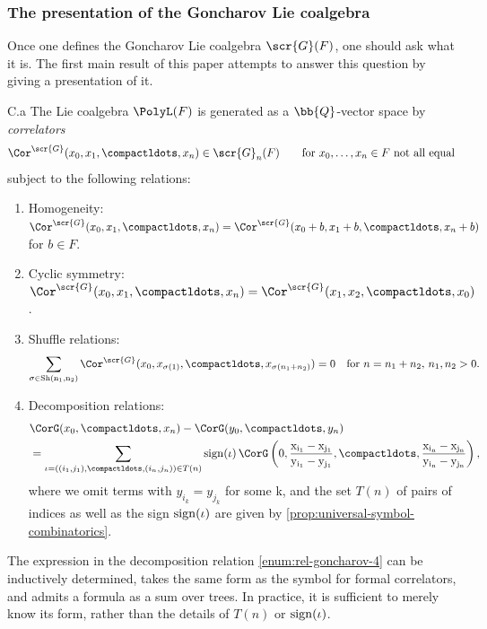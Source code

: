 \documentclass[a4paper]{amsart}
\begin{document}
\subsubsection{The presentation of the Goncharov Lie coalgebra}
Once one defines the Goncharov Lie coalgebra $\scr{G}(F)$, one should ask what it is. The first main result of this paper attempts to answer this question by giving a presentation of it.

\begin{customthm}{C.a}\label{thm:polyl-presentation-additive}
    The Lie coalgebra $\PolyL(F)$ is generated as a $\bb{Q}$-vector space by \emph{correlators}
    \[\Cor^\scr{G}(x_0,x_1,\compactldots,x_n) \in \scr{G}_n(F) \qquad \text{for $x_0,\ldots,x_n \in F$ not all equal }\]  
    subject to the following relations:
    \begin{enumerate}[\noindent (1)]
\item \label{enum:rel-goncharov-1} Homogeneity: $\Cor^\scr{G}(x_0,x_1,\compactldots,x_n)=\Cor^\scr{G}(x_0+b,x_1+b,\compactldots,x_n+b)$ for $b\in F$.
\item \label{enum:rel-goncharov-2} Cyclic symmetry: $\Cor^\scr{G}(x_0,x_1,\compactldots,x_n)=\Cor^\scr{G}(x_1,x_2,\compactldots,x_0)$.
\item \label{enum:rel-goncharov-3} Shuffle relations: 
\[\sum_{\sigma \in \rm{Sh}(n_1,n_2)} \Cor^\scr{G}(x_0,x_{\sigma(1)},\compactldots,x_{\sigma(n_1+n_2)}) =0 \quad 
\text{for $n=n_1+n_2$, $n_1,n_2>0$.}\]
\item \label{enum:rel-goncharov-4} Decomposition relations:
\begin{align*}
    &\CorG(x_0,\compactldots,x_n)-\CorG(y_0,\compactldots,y_n)\\
     &=\sum_{\iota=((i_1,j_1),\compactldots,(i_{n},j_n))\in T(n)}\rm{sign}(\iota)\,
     \CorG\left(0,\frac{x_{i_1}-x_{j_1}}{y_{i_1}-y_{j_1}},\compactldots,\frac{x_{i_n}-x_{j_n}}{y_{i_n}-y_{j_n}}\right),
\end{align*}
where we omit terms with $y_{i_k}=y_{j_k}$ for some k, and the set $T(n)$ of pairs of indices as well as the sign $\rm{sign}(\iota)$ are given by \cref{prop:universal-symbol-combinatorics}.
\end{enumerate}
\end{customthm}

\begin{remark*}The expression in the decomposition relation \eqref{enum:rel-goncharov-4} can be inductively determined, takes the same form as the symbol for formal correlators, and admits a formula as a sum over trees. In practice, it is sufficient to merely know its form, rather than the details of $T(n)$ or $\rm{sign}(\iota)$.\end{remark*}
\end{document}

